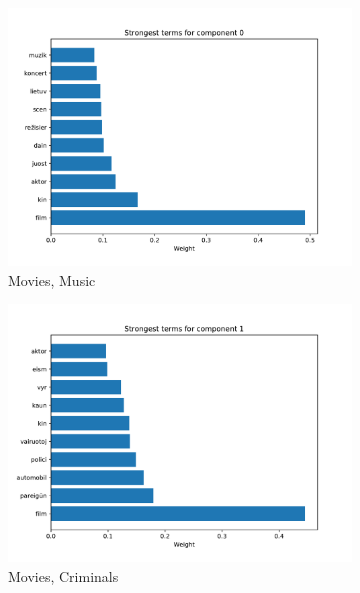 \documentclass{article}
\begin{document}
\begin{figure}[H]
	\begin{subfigure}{.6\textwidth}
		\centering
		\includegraphics[width=1\linewidth]{images/0_component_lsa.pdf}
		\caption{Movies, Music}
		\label{fig:sfig1}
	\end{subfigure}%
	\begin{subfigure}{.6\textwidth}
		\centering
		\includegraphics[width=1\linewidth]{images/1_component_lsa.pdf}
		\caption{Movies, Criminals}
		\label{fig:sfig2}
	\end{subfigure}
	\begin{subfigure}{.6\textwidth}
		\centering

\end{subfigure}
\end{figure}
\end{document}
